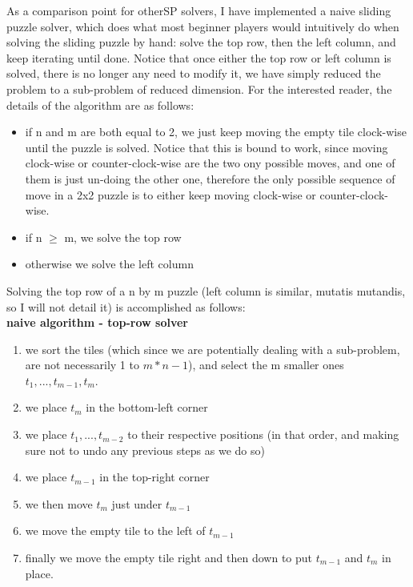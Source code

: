 As a comparison point for otherSP solvers, I have implemented a naive sliding puzzle solver, which does what most beginner players would intuitively do when solving the sliding puzzle by hand: solve the top row, then the left column, and keep iterating until done. Notice that once either the top row or left column is solved, there is no longer any need to modify it, we have simply reduced the problem to a sub-problem of reduced dimension. For the interested reader, the details of the algorithm are as follows:
\begin{itemize}
\item if n and m are both equal to 2, we just keep moving the empty tile clock-wise until the puzzle is solved. Notice that this is bound to work, since moving clock-wise or counter-clock-wise are the two ony possible moves, and one of them is just un-doing the other one, therefore the only possible sequence of move in a 2x2 puzzle is to either keep moving clock-wise or counter-clock-wise.
\item if n $\geq$ m, we solve the top row
\item otherwise we solve the left column
\end{itemize}
Solving the top row of a n by m puzzle (left column is similar, mutatis mutandis, so I will not detail it) is accomplished as follows:
\\
\textbf{naive algorithm - top-row solver}
\begin{enumerate}
\item \label{s1} we sort the tiles (which since we are potentially dealing with a sub-problem, are not necessarily 1 to $m* n - 1$), and select the m smaller ones $t_{1}, ..., t_{m-1}, t_{m}$.
\item \label{s2} we place $t_{m}$ in the bottom-left corner
\item \label{s3} we place $t_{1}, ..., t_{m-2}$ to their respective positions (in that order, and making sure not to undo any previous steps as we do so)
\item \label{s4} we place $t_{m-1}$ in the top-right corner
\item \label{s5} we then move $t_{m}$ just under $t_{m-1}$
\item \label{s6} we move the empty tile to the left of $t_{m-1}$
\item \label{s7} finally we move the empty tile right and then down to put $t_{m-1}$ and $t_{m}$ in place.
\end{enumerate}
